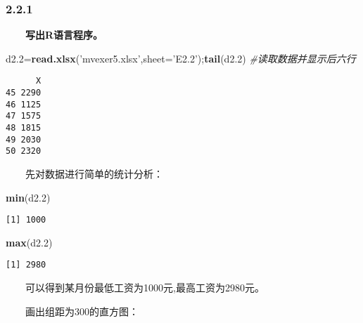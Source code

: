 \documentclass[
]{article}
\newenvironment{Shaded}{\begin{snugshade}}{\end{snugshade}}
\newcommand{\CommentTok}[1]{\textcolor[rgb]{0.56,0.35,0.01}{\textit{#1}}}
\newcommand{\DataTypeTok}[1]{\textcolor[rgb]{0.13,0.29,0.53}{#1}}
\newcommand{\DecValTok}[1]{\textcolor[rgb]{0.00,0.00,0.81}{#1}}
\newcommand{\FloatTok}[1]{\textcolor[rgb]{0.00,0.00,0.81}{#1}}
\newcommand{\KeywordTok}[1]{\textcolor[rgb]{0.13,0.29,0.53}{\textbf{#1}}}
\newcommand{\NormalTok}[1]{#1}
\newcommand{\OperatorTok}[1]{\textcolor[rgb]{0.81,0.36,0.00}{\textbf{#1}}}
\newcommand{\StringTok}[1]{\textcolor[rgb]{0.31,0.60,0.02}{#1}}
\begin{document}
\hypertarget{section-2}{%
\subsubsection{2.2.1}\label{section-2}}

　　\textbf{写出R语言程序。}

\begin{Shaded}
\begin{Highlighting}[]
\NormalTok{d2}\FloatTok{.2}\NormalTok{=}\KeywordTok{read.xlsx}\NormalTok{(}\StringTok{'mvexer5.xlsx'}\NormalTok{,}\DataTypeTok{sheet=}\StringTok{'E2.2'}\NormalTok{);}\KeywordTok{tail}\NormalTok{(d2}\FloatTok{.2}\NormalTok{)  }\CommentTok{#读取数据并显示后六行}
\end{Highlighting}
\end{Shaded}

\begin{verbatim}
      X
45 2290
46 1125
47 1575
48 1815
49 2030
50 2320
\end{verbatim}

　　先对数据进行简单的统计分析：

\begin{Shaded}
\begin{Highlighting}[]
\KeywordTok{min}\NormalTok{(d2}\FloatTok{.2}\NormalTok{)}
\end{Highlighting}
\end{Shaded}

\begin{verbatim}
[1] 1000
\end{verbatim}

\begin{Shaded}
\begin{Highlighting}[]
\KeywordTok{max}\NormalTok{(d2}\FloatTok{.2}\NormalTok{)}
\end{Highlighting}
\end{Shaded}

\begin{verbatim}
[1] 2980
\end{verbatim}

　　可以得到某月份最低工资为1000元,最高工资为2980元。

　　画出组距为300的直方图：

\begin{Shaded}
\end{Shaded}
\end{document}

